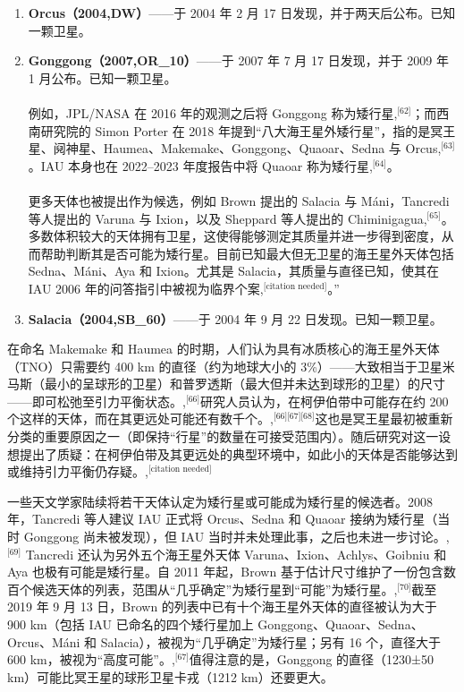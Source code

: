 \begin{enumerate}
\item \textbf{Orcus（2004,DW）}——于 2004 年 2 月 17 日发现，并于两天后公布。已知一颗卫星。
\item \textbf{Gonggong（2007,OR_{10}）}——于 2007 年 7 月 17 日发现，并于 2009 年 1 月公布。已知一颗卫星。\\\\
例如，JPL/NASA 在 2016 年的观测之后将 Gonggong 称为矮行星,\(^\text{[62]}\)；而西南研究院的 Simon Porter 在 2018 年提到“八大海王星外矮行星”，指的是冥王星、阋神星、Haumea、Makemake、Gonggong、Quaoar、Sedna 与 Orcus,\(^\text{[63]}\)。IAU 本身也在 2022–2023 年度报告中将 Quaoar 称为矮行星,\(^\text{[64]}\)。\\\\
更多天体也被提出作为候选，例如 Brown 提出的 Salacia 与 Máni，Tancredi 等人提出的 Varuna 与 Ixion，以及 Sheppard 等人提出的 Chiminigagua,\(^\text{[65]}\)。多数体积较大的天体拥有卫星，这使得能够测定其质量并进一步得到密度，从而帮助判断其是否可能为矮行星。目前已知最大但无卫星的海王星外天体包括 Sedna、Máni、Aya 和 Ixion。尤其是 Salacia，其质量与直径已知，使其在 IAU 2006 年的问答指引中被视为临界个案,\(^\text{[citation needed]}\)。”
\item \textbf{Salacia（2004,SB_{60}）}——于 2004 年 9 月 22 日发现。已知一颗卫星。
\end{enumerate}
在命名 Makemake 和 Haumea 的时期，人们认为具有冰质核心的海王星外天体（TNO）只需要约 400 km 的直径（约为地球大小的 3\%）——大致相当于卫星米马斯（最小的呈球形的卫星）和普罗透斯（最大但并未达到球形的卫星）的尺寸——即可松弛至引力平衡状态。,\(^\text{[66]}\)研究人员认为，在柯伊伯带中可能存在约 200 个这样的天体，而在其更远处可能还有数千个。,\(^\text{[66][67][68]}\)这也是冥王星最初被重新分类的重要原因之一（即保持“行星”的数量在可接受范围内）。随后研究对这一设想提出了质疑：在柯伊伯带及其更远处的典型环境中，如此小的天体是否能够达到或维持引力平衡仍存疑。,\(^\text{[citation needed]}\)

一些天文学家陆续将若干天体认定为矮行星或可能成为矮行星的候选者。2008 年，Tancredi 等人建议 IAU 正式将 Orcus、Sedna 和 Quaoar 接纳为矮行星（当时 Gonggong 尚未被发现），但 IAU 当时并未处理此事，之后也未进一步讨论。,\(^\text{[69]}\) Tancredi 还认为另外五个海王星外天体 Varuna、Ixion、Achlys、Goibniu 和 Aya 也极有可能是矮行星。自 2011 年起，Brown 基于估计尺寸维护了一份包含数百个候选天体的列表，范围从“几乎确定”为矮行星到“可能”为矮行星。,\(^\text{[70]}\)截至 2019 年 9 月 13 日，Brown 的列表中已有十个海王星外天体的直径被认为大于 900 km（包括 IAU 已命名的四个矮行星加上 Gonggong、Quaoar、Sedna、Orcus、Máni 和 Salacia），被视为“几乎确定”为矮行星；另有 16 个，直径大于 600 km，被视为“高度可能”。,\(^\text{[67]}\)值得注意的是，Gonggong 的直径（1230±50 km）可能比冥王星的球形卫星卡戎（1212 km）还要更大。

